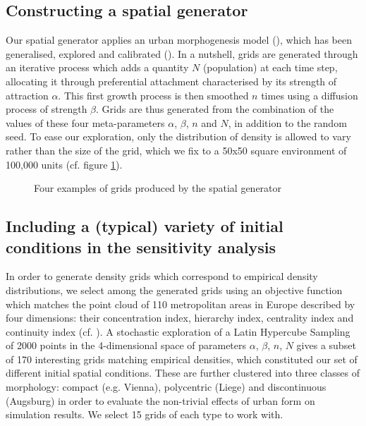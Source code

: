 \documentclass[Afour,sageh,times]{sagej}
\begin{document}
\subsection{Constructing a spatial generator}

Our spatial generator applies an urban morphogenesis model (\cite{Batty2007}), which has been generalised, explored and calibrated (\cite{Raimbault2014}). In a nutshell, grids are generated through an iterative process which adds a quantity $N$ (population) at each time step, allocating it through preferential attachment characterised by its strength of attraction $\alpha$. This first growth process is then smoothed $n$ times using a diffusion process of strength $\beta$. Grids are thus generated from the combination of the values of these four meta-parameters $\alpha$, $\beta$, $n$ and $N$, in addition to the random seed. To ease our exploration, only the distribution of density is allowed to vary rather than the size of the grid, which we fix to a 50x50 square environment of 100,000 units (cf. figure \ref{fig:spatialGen}).


\begin{figure}[htbp] \begin{center} 
 \caption{Four examples of grids produced by the spatial generator} \label{fig:spatialGen} \end{center} \end{figure} %


\subsection{Including a (typical) variety of initial conditions in the sensitivity analysis}

In order to generate density grids which correspond to empirical density distributions, we select among the generated grids using an objective function which matches the point cloud of 110 metropolitan areas in Europe described by four dimensions: their concentration index, hierarchy index, centrality index and continuity index (cf. \cite{LeNechet2015}). A stochastic exploration of a Latin Hypercube Sampling of 2000 points in the 4-dimensional space of parameters {$\alpha$, $\beta$, $n$, $N$} gives a subset of 170 interesting grids matching empirical densities, which constituted our set of different initial spatial conditions. These are further clustered into three classes of morphology: compact (e.g. Vienna), polycentric (Liege) and discontinuous (Augsburg) in order to evaluate the non-trivial effects of urban form on simulation results. We select 15 grids of each type to work with.
\end{document}

